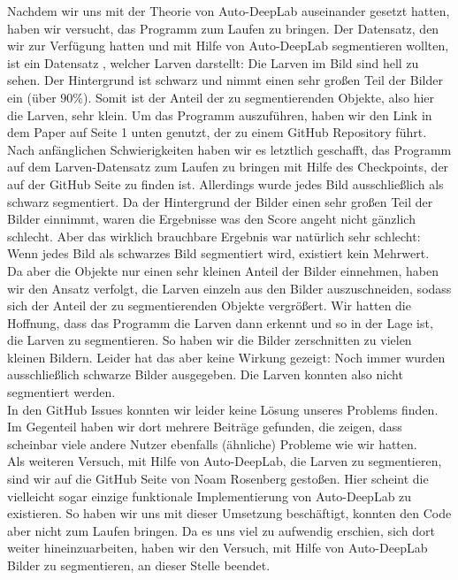 Nachdem wir uns mit der Theorie von Auto-DeepLab auseinander gesetzt hatten, haben wir versucht, das Programm zum Laufen zu bringen. Der Datensatz, den wir zur Verfügung hatten und mit Hilfe von Auto-DeepLab segmentieren wollten, ist ein Datensatz \cite{larven}, welcher Larven  darstellt: Die Larven im Bild sind hell zu sehen. Der Hintergrund ist schwarz und nimmt einen sehr großen Teil der Bilder ein (über $90\%$). Somit ist der Anteil der zu segmentierenden Objekte, also hier die Larven, sehr klein. Um das Programm auszuführen, haben wir den Link in dem Paper \cite{autodeeplabPaper} auf Seite 1 unten genutzt, der zu einem GitHub Repository führt. Nach anfänglichen Schwierigkeiten haben wir es letztlich geschafft, das Programm auf dem Larven-Datensatz zum Laufen zu bringen mit Hilfe des Checkpoints, der auf der GitHub Seite zu finden ist. Allerdings wurde jedes Bild ausschließlich als schwarz segmentiert. Da der Hintergrund der Bilder einen sehr großen Teil der Bilder einnimmt, waren die Ergebnisse was den Score angeht nicht gänzlich schlecht. Aber das wirklich brauchbare Ergebnis war natürlich sehr schlecht: Wenn jedes Bild als schwarzes Bild segmentiert wird, existiert kein Mehrwert.\\
Da aber die Objekte nur einen sehr kleinen Anteil der Bilder einnehmen, haben wir den Ansatz verfolgt, die Larven einzeln aus den Bilder auszuschneiden, sodass sich der Anteil der zu segmentierenden Objekte vergrößert. Wir hatten die Hoffnung, dass das Programm die Larven dann erkennt und so in der Lage ist, die Larven zu segmentieren. So haben wir die Bilder zerschnitten zu vielen kleinen Bildern. Leider hat das aber keine Wirkung gezeigt: Noch immer wurden ausschließlich schwarze Bilder ausgegeben. Die Larven konnten also nicht segmentiert werden.\\
In den GitHub Issues konnten wir leider keine Lösung unseres Problems finden. Im Gegenteil haben wir dort mehrere Beiträge gefunden, die zeigen, dass scheinbar viele andere Nutzer ebenfalls (ähnliche) Probleme wie wir hatten.\\
Als weiteren Versuch, mit Hilfe von Auto-DeepLab, die Larven zu segmentieren, sind wir auf die GitHub Seite von Noam Rosenberg \cite{deeplabRosenberg} gestoßen. Hier scheint die vielleicht sogar einzige funktionale Implementierung von Auto-DeepLab zu existieren. So haben wir uns mit dieser Umsetzung beschäftigt, konnten den Code aber nicht zum Laufen bringen. Da es uns viel zu aufwendig erschien, sich dort weiter hineinzuarbeiten, haben wir den Versuch, mit Hilfe von Auto-DeepLab Bilder zu segmentieren, an dieser Stelle beendet.


